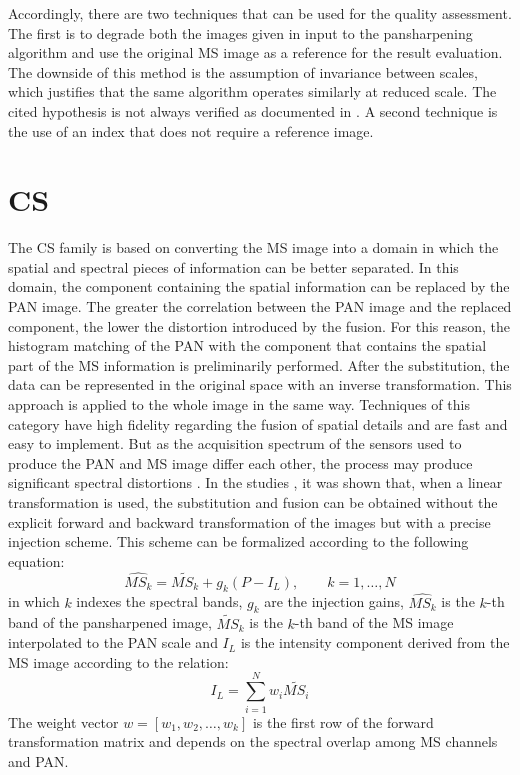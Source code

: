 \documentclass[12pt]{report}
\begin{document}
Accordingly, there are two techniques that can be used for the quality assessment. The first is to degrade both the images given in input to the pansharpening algorithm and use the original MS image as a reference for the result evaluation. The downside of this method is the assumption of invariance between scales, which justifies that the same algorithm operates similarly at reduced scale. The cited hypothesis  is not always verified as documented in \cite{scaleinvariance1, towaldetal}. A second technique is the use of an index that does not require a reference image.


\section{CS}

The CS family is based on converting the MS image into a domain in which the spatial and spectral pieces of information can be better separated. In this domain, the component containing the spatial information can be replaced by the PAN image. The greater the correlation between the PAN image and the replaced component, the lower the distortion introduced by the fusion. For this reason, the histogram matching of the PAN with the component that contains the spatial part of the MS information is preliminarily performed.
After the substitution, the data can be represented in the original space with an inverse transformation. This approach is applied to the whole image in the same way. Techniques of this category have high fidelity regarding the fusion of spatial details and are fast and easy to implement. But as the acquisition spectrum of the sensors used to produce the PAN and MS image differ each other, the process may produce significant spectral distortions \cite{cs1,cs2}. 
In the studies \cite{cs3,cs4,cs5,cs6,cs7}, it was shown that, when a linear transformation is used, the substitution and fusion can be obtained without the explicit forward and backward transformation of the images but with a precise injection scheme. This scheme can be formalized according to the following equation:
\begin{equation}
    \widehat{MS_k} = \widetilde{MS_k} + g_k(P - I_L), \qquad k = 1,\dots,N
    \label{cs}
\end{equation}
%
in which $k$ indexes the spectral bands, $g_k$ are the injection gains, $\widehat{MS_k}$ is the $k$-th band of the pansharpened image, $\widetilde{MS}_k$ is the $k$-th band of the MS image interpolated to the PAN scale and $I_L$ is the intensity component derived from the MS image according to the relation:
% 
\begin{equation}
    I_L = \sum_{i=1}^{N} w_i\widetilde{MS_i}
    \label{ilcs}
\end{equation}
%
The weight vector $w= [w_1,w_2, \ldots,w_k] $ is the first row of the forward transformation matrix and depends on the spectral overlap among MS channels and PAN.
 
\end{document}
